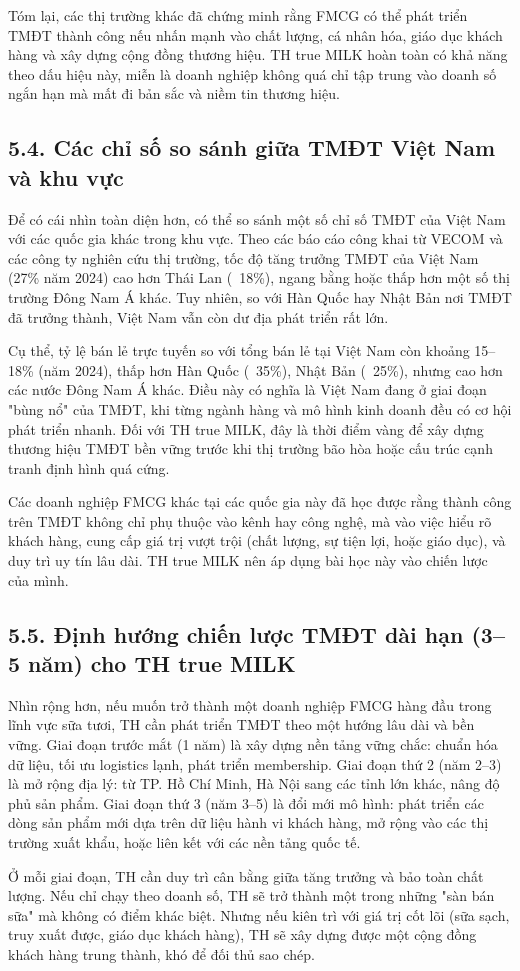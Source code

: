 Tóm lại, các thị trường khác đã chứng minh rằng FMCG có thể phát triển TMĐT thành công nếu nhấn mạnh vào chất lượng, cá nhân hóa, giáo dục khách hàng và xây dựng cộng đồng thương hiệu. TH true MILK hoàn toàn có khả năng theo dấu hiệu này, miễn là doanh nghiệp không quá chỉ tập trung vào doanh số ngắn hạn mà mất đi bản sắc và niềm tin thương hiệu.

\subsection*{5.4. Các chỉ số so sánh giữa TMĐT Việt Nam và khu vực}
Để có cái nhìn toàn diện hơn, có thể so sánh một số chỉ số TMĐT của Việt Nam với các quốc gia khác trong khu vực. Theo các báo cáo công khai từ VECOM và các công ty nghiên cứu thị trường, tốc độ tăng trưởng TMĐT của Việt Nam (27\% năm 2024) cao hơn Thái Lan (~18\%), ngang bằng hoặc thấp hơn một số thị trường Đông Nam Á khác. Tuy nhiên, so với Hàn Quốc hay Nhật Bản nơi TMĐT đã trưởng thành, Việt Nam vẫn còn dư địa phát triển rất lớn.

Cụ thể, tỷ lệ bán lẻ trực tuyến so với tổng bán lẻ tại Việt Nam còn khoảng 15--18\% (năm 2024), thấp hơn Hàn Quốc (~35\%), Nhật Bản (~25\%), nhưng cao hơn các nước Đông Nam Á khác. Điều này có nghĩa là Việt Nam đang ở giai đoạn "bùng nổ" của TMĐT, khi từng ngành hàng và mô hình kinh doanh đều có cơ hội phát triển nhanh. Đối với TH true MILK, đây là thời điểm vàng để xây dựng thương hiệu TMĐT bền vững trước khi thị trường bão hòa hoặc cấu trúc cạnh tranh định hình quá cứng.

Các doanh nghiệp FMCG khác tại các quốc gia này đã học được rằng thành công trên TMĐT không chỉ phụ thuộc vào kênh hay công nghệ, mà vào việc hiểu rõ khách hàng, cung cấp giá trị vượt trội (chất lượng, sự tiện lợi, hoặc giáo dục), và duy trì uy tín lâu dài. TH true MILK nên áp dụng bài học này vào chiến lược của mình.

\subsection*{5.5. Định hướng chiến lược TMĐT dài hạn (3--5 năm) cho TH true MILK}
Nhìn rộng hơn, nếu muốn trở thành một doanh nghiệp FMCG hàng đầu trong lĩnh vực sữa tươi, TH cần phát triển TMĐT theo một hướng lâu dài và bền vững. Giai đoạn trước mắt (1 năm) là xây dựng nền tảng vững chắc: chuẩn hóa dữ liệu, tối ưu logistics lạnh, phát triển membership. Giai đoạn thứ 2 (năm 2--3) là mở rộng địa lý: từ TP. Hồ Chí Minh, Hà Nội sang các tỉnh lớn khác, nâng độ phủ sản phẩm. Giai đoạn thứ 3 (năm 3--5) là đổi mới mô hình: phát triển các dòng sản phẩm mới dựa trên dữ liệu hành vi khách hàng, mở rộng vào các thị trường xuất khẩu, hoặc liên kết với các nền tảng quốc tế.

Ở mỗi giai đoạn, TH cần duy trì cân bằng giữa tăng trưởng và bảo toàn chất lượng. Nếu chỉ chạy theo doanh số, TH sẽ trở thành một trong những "sàn bán sữa" mà không có điểm khác biệt. Nhưng nếu kiên trì với giá trị cốt lõi (sữa sạch, truy xuất được, giáo dục khách hàng), TH sẽ xây dựng được một cộng đồng khách hàng trung thành, khó để đối thủ sao chép.
